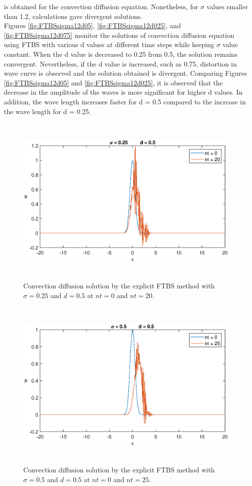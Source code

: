 \documentclass[letterpaper,12pt]{article}
\begin{document}
is obtained for the convection diffusion equation. Nonetheless, for $\sigma$ values smaller than 1.2, calculations
gave divergent solutions. 
\\
\indent Figures \ref{fig:FTBSsigma12d05}, \ref{fig:FTBSsigma12d025}, and \ref{fig:FTBSsigma12d075} monitor the 
solutions of convection diffusion equation using FTBS with various d values at different time steps
while keeping $\sigma$ value constant. When the d value is decreased to 0.25 from 0.5, the solution remains
convergent. Nevertheless, if the d value is increased, such as 0.75, distortion in wave curve is observed and
the solution obtained is divergent. Comparing Figures \ref{fig:FTBSsigma12d05} and \ref{fig:FTBSsigma12d025},
it is observed that the decrease in the amplitude of the waves is more significant for higher d values. In addition,
the wave length increases faster for d = 0.5 compared to the increase in the wave length for d = 0.25.
\begin{figure}[!ht] 
	\centering 
	\includegraphics[max height=8.5cm]{graphs/FTBS/ConvectionDiffusion/sigma025d05.eps}
	\caption{Convection diffusion solution by the explicit FTBS method with $\sigma= 0.25$ and $d=0.5$ at $nt=0$ and $nt=20$.}
	 \label{fig:FTBSsigma025d05}
\end{figure}
\begin{figure}[!ht] 
	\centering 
	\includegraphics[max height=8.5cm]{graphs/FTBS/ConvectionDiffusion/sigma05d05.eps}
	\caption{Convection diffusion solution by the explicit FTBS method with $\sigma= 0.5$ and $d=0.5$ at $nt=0$ and $nt=25$.}
	 \label{fig:FTBSsigma05d05}
\end{figure}
\end{document}
